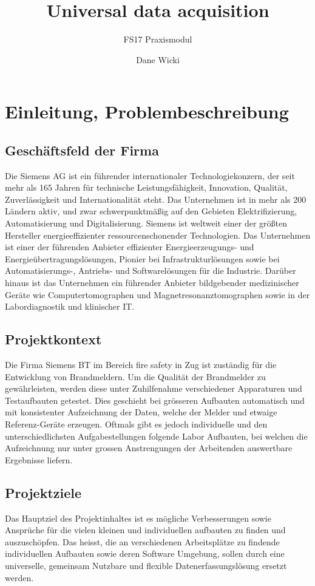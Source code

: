 \documentclass[10pt]{scrartcl}
\author{Dane Wicki}
\title{Universal data acquisition}
\subtitle{FS17 Praxismodul}
\begin{document}
\maketitle
\tableofcontents
\section{Einleitung, Problembeschreibung}
\subsection{Geschäftsfeld der Firma}
Die Siemens AG ist ein führender internationaler Technologiekonzern, der seit mehr als 165 Jahren für technische Leistungsfähigkeit, Innovation, Qualität, Zuverlässigkeit und Internationalität steht. Das Unternehmen ist in mehr als 200 Ländern aktiv, und zwar schwerpunktmäßig auf den Gebieten Elektrifizierung, Automatisierung und Digitalisierung. Siemens ist weltweit einer der größten Hersteller energieeffizienter ressourcenschonender Technologien. Das Unternehmen ist einer der führenden Anbieter effizienter Energieerzeugungs- und Energieübertragungslösungen, Pionier bei Infrastrukturlösungen sowie bei Automatisierungs-, Antriebs- und Softwarelösungen für die Industrie. Darüber hinaus ist das Unternehmen ein führender Anbieter bildgebender medizinischer Geräte wie Computertomographen und Magnetresonanztomographen sowie in der Labordiagnostik und klinischer IT.  
\subsection{Projektkontext}
Die Firma Siemens BT im Bereich fire safety in Zug ist zuständig für die Entwicklung von Brandmeldern.
Um die Qualität der Brandmelder zu gewährleisten, werden diese unter Zuhilfenahme
verschiedener Apparaturen und Testaufbauten getestet. Dies geschieht bei grösseren Aufbauten automatisch und mit konsistenter Aufzeichnung der Daten, welche der Melder und etwaige Referenz-Geräte erzeugen. Oftmals gibt es jedoch individuelle und den unterschiedlichsten Aufgabestellungen folgende Labor Aufbauten, bei welchen die Aufzeichnung nur unter grossen Anstrengungen der Arbeitenden auswertbare Ergebnisse liefern.
\subsection{Projektziele}
Das Hauptziel des Projektinhaltes ist es mögliche Verbesserungen sowie Ansprüche für die vielen kleinen und individuellen aufbauten zu finden und auszuschöpfen. Das heisst, die an verschiedenen Arbeitsplätze zu findende individuellen Aufbauten sowie deren Software Umgebung, sollen durch eine universelle, gemeinsam Nutzbare und flexible Datenerfassungslösung ersetzt werden.
\end{document}
